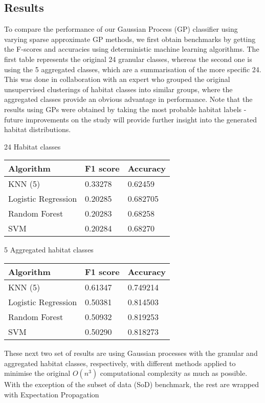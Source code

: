 \documentclass[10pt,sts]{article}
\begin{document}
\begin{multicols}{2}
\section{Results}

To compare the performance of our Gaussian Process (GP) classifier using varying sparse approximate GP methods, we first obtain benchmarks by getting the F-scores and accuracies using deterministic machine learning algorithms. The first table represents the original 24 granular classes, whereas the second one is using the 5 aggregated classes, which are a summarisation of the more specific 24. This was done in collaboration with an expert who grouped the original unsupervised clusterings of habitat classes into similar groups, where the aggregated classes provide an obvious advantage in performance. Note that the results using GPs were obtained by taking the most probable habitat labels - future improvements on the study will provide further insight into the generated habitat distributions.
    
24 Habitat classes

\begin{tabular}{| l | l | l |}
    \hline
    Algorithm           & F1 score & Accuracy \\\hline
    KNN (5)             & 0.33278 & 0.62459 \\
    Logistic Regression & 0.20285 & 0.682705 \\
    Random Forest       & 0.20283 & 0.68258 \\
    SVM                 & 0.20284 & 0.68270 \\\hline
\end{tabular}

5 Aggregated habitat classes

\begin{tabular}{| l | l | l |}
    \hline
    Algorithm           & F1 score & Accuracy \\\hline
    KNN (5)             & 0.61347 & 0.749214 \\
    Logistic Regression & 0.50381 & 0.814503 \\
    Random Forest       & 0.50932 & 0.819253 \\
    SVM                 & 0.50290 & 0.818273 \\\hline
\end{tabular}

These next two set of results are using Gaussian processes with the granular and aggregated habitat classes, respectively, with different methods applied to minimise the original $O(n^3)$ computational complexity as much as possible. With the exception of the subset of data (SoD) benchmark, the rest are wrapped with Expectation Propagation


\end{multicols}
\end{document}
